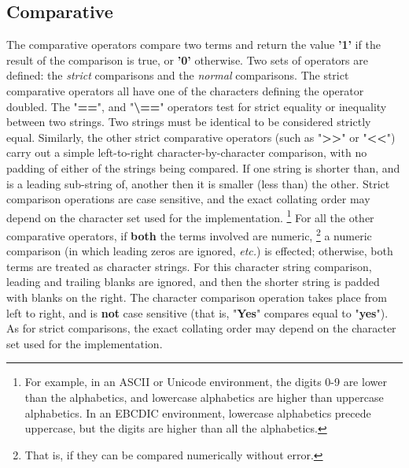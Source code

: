 \subsection{Comparative}\label{refcomps}
The comparative operators compare two terms and return the
value \textbf{'1'} if the result of the comparison is true,
or \textbf{'0'} otherwise.  Two sets of operators are defined: the
\emph{strict} comparisons and the \emph{normal} comparisons.
 The strict comparative operators all have one of the characters
defining the operator doubled.  The "\textbf{==}",
and "\textbf{\textbackslash ==}" operators
test for strict equality or inequality between two strings.
Two strings must be identical to be considered strictly equal.
Similarly, the other strict comparative operators (such as
"\textbf{>>}" or "\textbf{<<}") carry out a simple
left-to-right character-by-character comparison, with no padding of
either of the strings being compared.
If one string is shorter than, and is a leading sub-string of, another
then it is smaller (less than) the other.
Strict comparison operations are case sensitive, and the exact collating
order may depend on the character set used for the implementation.
\footnote{
For example, in an ASCII or Unicode environment, the digits 0-9
are lower than the alphabetics, and lowercase alphabetics are higher
than uppercase alphabetics.
In an EBCDIC environment, lowercase alphabetics precede uppercase, but
the digits are higher than all the alphabetics.
}
 For all the other comparative operators, if \textbf{both} the
terms involved are numeric,
\footnote{
That is, if they can be compared numerically without error.
}
a numeric comparison (in which leading zeros are ignored,
\emph{etc.}) is effected; otherwise, both terms are treated as character
strings.
For this character string comparison, leading and trailing blanks are
ignored, and then the shorter string is padded with blanks on the right.
The character comparison operation takes place from left to right, and
is \textbf{not} case sensitive (that is, "\textbf{Yes}"
compares equal to "\textbf{yes}").
As for strict comparisons, the exact collating order may depend on the
character set used for the implementation.

